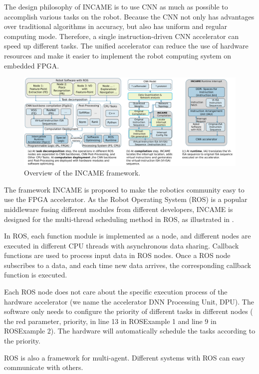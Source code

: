 \label{sec:incame}


The design philosophy of INCAME is to use CNN as much as possible to accomplish various tasks on the robot. Because the CNN not only has advantages over traditional algorithms in accuracy, but also has uniform and regular computing mode. Therefore, a single instruction-driven CNN accelerator can speed up different tasks. The unified accelerator can reduce the use of hardware resources and make it easier to implement the robot computing system on embedded FPGA.


\begin{figure}[t]
	\centering
    \includegraphics[width=0.99\linewidth]{fig/incame.pdf}
    \caption{ Overview of the INCAME framework.}
	\label{fig:incame}
\end{figure}

The framework INCAME is proposed to make the robotics community easy to use the FPGA accelerator. As the Robot Operating System (ROS) \cite{quigley2009ros} is a popular middleware fusing different modules from different developers, INCAME is designed for the multi-thread scheduling method in ROS, as illustrated in .

In ROS, each function module is implemented as a node, and different nodes are executed in different CPU threads with asynchronous data sharing. Callback functions are used to process input data in ROS nodes. Once a ROS node subscribes to a data, and each time new data arrives, the corresponding callback function is executed.

Each ROS node does not care about the specific execution process of the hardware accelerator (we name the accelerator DNN Processing Unit, DPU). The software only needs to configure the priority of different tasks in different nodes ( the red parameter, priority, in line 13 in ROSExample 1 and line 9 in ROSExample 2). The hardware will automatically schedule the tasks according to the priority.

ROS is also a framework for multi-agent. Different systems with ROS can easy communicate with others.

